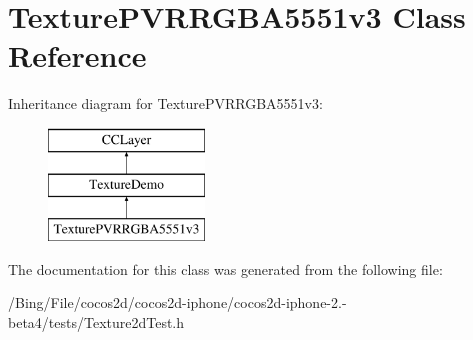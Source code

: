 \hypertarget{interface_texture_p_v_r_r_g_b_a5551v3}{\section{Texture\-P\-V\-R\-R\-G\-B\-A5551v3 Class Reference}
\label{interface_texture_p_v_r_r_g_b_a5551v3}
}
Inheritance diagram for Texture\-P\-V\-R\-R\-G\-B\-A5551v3\-:\begin{figure}[H]
\begin{center}
\leavevmode
\includegraphics[height=3.000000cm]{interface_texture_p_v_r_r_g_b_a5551v3}
\end{center}
\end{figure}


The documentation for this class was generated from the following file\-:\begin{DoxyCompactItemize}
\item 
/\-Bing/\-File/cocos2d/cocos2d-\/iphone/cocos2d-\/iphone-\/2.-\/beta4/tests/Texture2d\-Test.\-h\end{DoxyCompactItemize}
